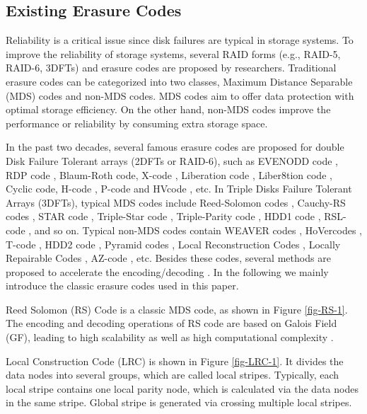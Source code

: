 \documentclass[sigconf]{acmart}
\begin{document}
\subsection{Existing Erasure Codes}\label{existEC}
Reliability is a critical issue since disk failures are typical in storage systems. To improve the reliability of storage systems, several RAID forms (e.g., RAID-5, RAID-6, 3DFTs) and erasure codes are proposed by researchers.  Traditional erasure codes can be categorized into two classes, Maximum Distance Separable (MDS) codes and non-MDS codes. MDS codes aim to offer data protection with optimal storage efficiency. On the other hand, non-MDS codes improve the performance or reliability by consuming extra storage space.

In the past two decades, several famous erasure codes are proposed for double Disk Failure Tolerant arrays (2DFTs or RAID-6), such as EVENODD code \cite{EVENODD}, RDP code \cite{RDP}, Blaum-Roth code\cite{BlaumRoth}, X-code \cite{XCode}, Liberation code \cite{Liberation}, Liber8tion code \cite{Liber8tion}, Cyclic \cite {Cyclic} code,
H-code \cite{hcode}, P-code \cite{PCode} and HVcode \cite{HVCode}, etc. 
In Triple Disks Failure Tolerant Arrays (3DFTs), typical MDS codes include Reed-Solomon codes \cite{RS}, Cauchy-RS codes \cite{CRS}, STAR code \cite{STAR}, Triple-Star code \cite{TripleStar}, Triple-Parity code \cite{TPtech}, HDD1 code \cite{HDD}, RSL-code \cite{RSL}, and so on. Typical non-MDS codes contain WEAVER codes \cite{WEAVER}, HoVercodes \cite{HoVer}, T-code \cite{TCode}, HDD2 code \cite{HDD}, Pyramid codes \cite{Pyramid}, Local Reconstruction Codes \cite{LRC}, Locally Repairable Codes \cite{XORing}, AZ-code \cite{AZ-code}, etc. Besides these codes, several methods are proposed to accelerate the encoding/decoding \cite{PCM}\cite{APCM}.
In the following we mainly introduce the classic erasure codes used in this paper.

Reed Solomon (RS) Code \cite{RS} is a classic MDS code, as shown in Figure \ref{fig-RS-1}. The encoding and decoding operations of RS code are based on Galois Field (GF), leading to high scalability as well as high computational complexity \cite{Optimizing2019}.

Local Construction Code (LRC) \cite{LRC} 
is shown in Figure \ref{fig-LRC-1}. It divides the data nodes into several groups, which are called local stripes. Typically, each local stripe contains one local parity node, which is calculated via the data nodes in the same stripe. Global stripe is generated via crossing multiple local stripes.
\end{document}
